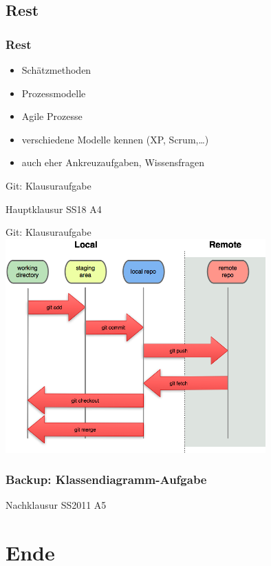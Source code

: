 \documentclass[18pt]{beamer}
\begin{document}
	\subsection{Rest}
	\begin{frame}
		\frametitle{Rest}
		\begin{itemize}
			\item Schätzmethoden \pause
			\item Prozessmodelle \pause
			\item Agile Prozesse \pause
			\item verschiedene Modelle kennen (XP, Scrum,\dots) \pause
			\item auch eher Ankreuzaufgaben, Wissensfragen
		\end{itemize}
	\end{frame}

	\begin{frame}{Git: Klausuraufgabe}
		\begin{huge}
			\centering Hauptklausur SS18 A4
		\end{huge}
	\end{frame}

	\begin{frame}{Git: Klausuraufgabe}
		\centering \includegraphics[width=100mm, scale=1.3]{./pics/tut0/git-file-lifecycle.png}
	\end{frame}

	\begin{frame}
		\frametitle{Backup: Klassendiagramm-Aufgabe}
		\begin{huge}
			\centering Nachklausur SS2011 A5
		\end{huge}
	\end{frame}

\section{Ende}
\end{document}
